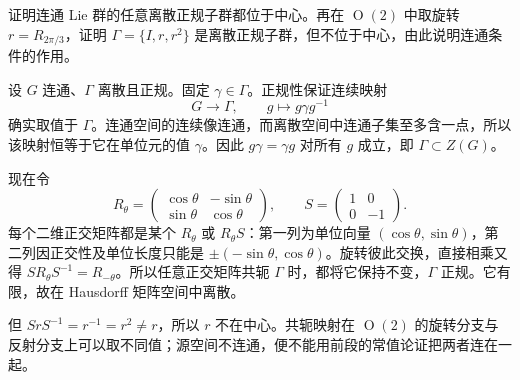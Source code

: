 \begin{exercise}\label{g1:ex:discrete-normal-subgroup-central}
	证明连通 Lie 群的任意离散正规子群都位于中心。再在 \(\operatorname{O}(2)\) 中取旋转 \(r=R_{2\pi/3}\)，证明 \(\Gamma=\{I,r,r^2\}\) 是离散正规子群，但不位于中心，由此说明连通条件的作用。
\end{exercise}
\begin{solution}
	设 \(G\) 连通、\(\Gamma\) 离散且正规。固定 \(\gamma\in\Gamma\)。正规性保证连续映射
	\[
		G\longrightarrow\Gamma,\qquad g\longmapsto g\gamma g^{-1}
	\]
	确实取值于 \(\Gamma\)。连通空间的连续像连通，而离散空间中连通子集至多含一点，所以该映射恒等于它在单位元的值 \(\gamma\)。因此 \(g\gamma=\gamma g\) 对所有 \(g\) 成立，即 \(\Gamma\subset Z(G)\)。

	现在令
	\[
		R_\theta=\begin{pmatrix}\cos\theta&-\sin\theta\\
		\sin\theta&\cos\theta\end{pmatrix},\qquad
		S=\begin{pmatrix}1&0\\0&-1\end{pmatrix}.
	\]
	每个二维正交矩阵都是某个 \(R_\theta\) 或 \(R_\theta S\)：第一列为单位向量 \((\cos\theta,\sin\theta)\)，第二列因正交性及单位长度只能是 \(\pm(-\sin\theta,\cos\theta)\)。旋转彼此交换，直接相乘又得 \(SR_\theta S^{-1}=R_{-\theta}\)。所以任意正交矩阵共轭 \(\Gamma\) 时，都将它保持不变，\(\Gamma\) 正规。它有限，故在 Hausdorff 矩阵空间中离散。

	但 \(SrS^{-1}=r^{-1}=r^2\ne r\)，所以 \(r\) 不在中心。共轭映射在 \(\operatorname{O}(2)\) 的旋转分支与反射分支上可以取不同值；源空间不连通，便不能用前段的常值论证把两者连在一起。
\end{solution}

